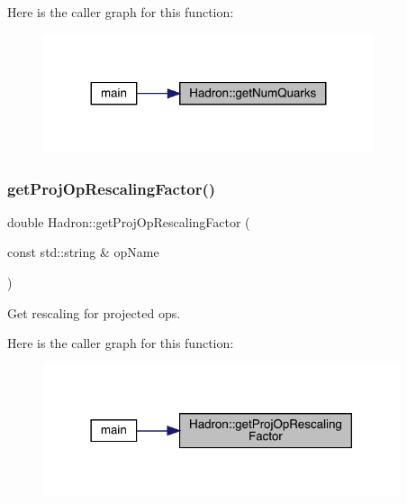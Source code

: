 Here is the caller graph for this function\+:
\nopagebreak
\begin{figure}[H]
\begin{center}
\leavevmode
\includegraphics[width=275pt]{d1/daf/namespaceHadron_a030f1f2fabdb2b0de5421b2a0a15689c_icgraph}
\end{center}
\end{figure}
\mbox{\label{namespaceHadron_aeb564a291631b101c405d7f4257391f8}} 
\subsubsection{\texorpdfstring{getProjOpRescalingFactor()}{getProjOpRescalingFactor()}}
{\footnotesize\ttfamily double Hadron\+::get\+Proj\+Op\+Rescaling\+Factor (\begin{DoxyParamCaption}\item[{const std\+::string \&}]{op\+Name }\end{DoxyParamCaption})}



Get rescaling for projected ops. 

Here is the caller graph for this function\+:
\nopagebreak
\begin{figure}[H]
\begin{center}
\leavevmode
\includegraphics[width=297pt]{d1/daf/namespaceHadron_aeb564a291631b101c405d7f4257391f8_icgraph}
\end{center}
\end{figure}
\mbox{\label{namespaceHadron_abc76a2d893a589ba2a1a346954901854}} 
